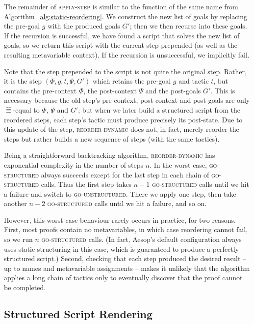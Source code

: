\documentclass[sigplan,10pt,anonymous,review]{acmart}
\newcommand{\step}[5]{\ensuremath{(#1,\allowbreak #2,\allowbreak #3,\allowbreak #4,\allowbreak #5)}}
\newcommand{\aeq}{\mathrel{\hat{≡}}}
\begin{document}
The remainder of \textsc{apply-step} is similar to the function of the same name from Algorithm~\ref{alg:static-reordering}.
We construct the new list of goals by replacing the pre-goal $g$ with the produced goals $G'$; then we then recurse into these goals.
If the recursion is successful, we have found a script that solves the new list of goals, so we return this script with the current step prepended (as well as the resulting metavariable context).
If the recursion is unsuccessful, we implicitly fail.

Note that the step prepended to the script is not quite the original step.
Rather, it is the step $\step{Φ}{g}{t}{Ψ}{G'}$ which retains the pre-goal $g$ and tactic $t$, but contains the pre-context $Φ$, the post-context $Ψ$ and the post-goals $G'$.
This is necessary because the old step's pre-context, post-context and post-goals are only $\aeq$-equal to $Φ$, $Ψ$ and $G'$; but when we later build a structured script from the reordered steps, each step's tactic must produce precisely its post-state.
Due to this update of the step, \textsc{reorder-dynamic} does not, in fact, merely reorder the steps but rather builds a new sequence of steps (with the same tactics).

Being a straightforward backtracking algorithm, \textsc{reorder-dynamic} has exponential complexity in the number of steps $n$.
In the worst case, \textsc{go-structured} always succeeds except for the last step in each chain of \textsc{go-structured} calls.
Thus the first step takes $n-1$ \textsc{go-structured} calls until we hit a failure and switch to \textsc{go-unstructured}.
There we apply one step, then take another $n-2$ \textsc{go-structured} calls until we hit a failure, and so on.

However, this worst-case behaviour rarely occurs in practice, for two reasons.
First, most proofs contain no metavariables, in which case reordering cannot fail, so we run $n$ \textsc{go-structured} calls.
(In fact, Aesop's default configuration always uses static structuring in this case, which is guaranteed to produce a perfectly structured script.)
Second, checking that each step produced the desired result -- up to names and metavariable assignments -- makes it unlikely that the algorithm applies a long chain of tactics only to eventually discover that the proof cannot be completed.

\subsection{Structured Script Rendering}%
\label{sec:rendering}
\end{document}

